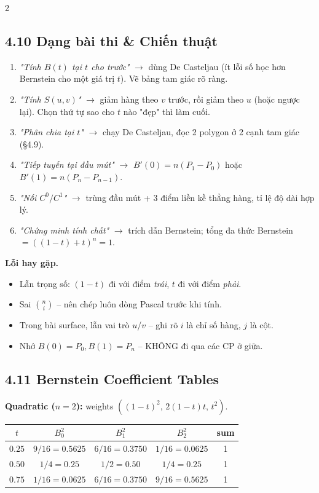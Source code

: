 \begin{paracol}{2}
\switchcolumn

\subsection*{4.10 Dạng bài thi \& Chiến thuật}

\begin{enumerate}[leftmargin=*,nosep]
  \item \emph{"Tính $B(t)$ tại $t$ cho trước"} $\to$ dùng De Casteljau (ít lỗi số học hơn Bernstein cho một giá trị $t$). Vẽ bảng tam giác rõ ràng.
  \item \emph{"Tính $S(u,v)$"} $\to$ giảm hàng theo $v$ trước, rồi giảm theo $u$ (hoặc ngược lại). Chọn thứ tự sao cho $t$ nào "đẹp" thì làm cuối.
  \item \emph{"Phân chia tại $t$"} $\to$ chạy De Casteljau, đọc 2 polygon ở 2 cạnh tam giác (\S 4.9).
  \item \emph{"Tiếp tuyến tại đầu mút"} $\to$ $B'(0)=n(P_1-P_0)$ hoặc $B'(1)=n(P_n-P_{n-1})$.
  \item \emph{"Nối $C^0/C^1$"} $\to$ trùng đầu mút + 3 điểm liền kề thẳng hàng, tỉ lệ độ dài hợp lý.
  \item \emph{"Chứng minh tính chất"} $\to$ trích dẫn Bernstein; tổng đa thức Bernstein $=((1-t)+t)^n=1$.
\end{enumerate}

\textbf{Lỗi hay gặp.}
\begin{itemize}[leftmargin=*,nosep]
  \item Lẫn trọng số: $(1-t)$ đi với điểm \emph{trái}, $t$ đi với điểm \emph{phải}.
  \item Sai $\binom{n}{i}$ -- nên chép luôn dòng Pascal trước khi tính.
  \item Trong bài surface, lẫn vai trò $u$/$v$ -- ghi rõ $i$ là chỉ số hàng, $j$ là cột.
  \item Nhớ $B(0)=P_0, B(1)=P_n$ -- KHÔNG đi qua các CP ở giữa.
\end{itemize}

\switchcolumn*

\subsection*{4.11 Bernstein Coefficient Tables}

\textbf{Quadratic ($n=2$):} weights $((1-t)^2,\,2(1-t)t,\,t^2)$.
\begin{center}\small
\begin{tabular}{c|ccc|c}
$t$ & $B_0^2$ & $B_1^2$ & $B_2^2$ & sum \\\midrule
$0.25$ & $9/16=0.5625$ & $6/16=0.3750$ & $1/16=0.0625$ & 1\\
$0.50$ & $1/4=0.25$    & $1/2=0.50$    & $1/4=0.25$    & 1\\
$0.75$ & $1/16=0.0625$ & $6/16=0.3750$ & $9/16=0.5625$ & 1\\
\end{tabular}
\end{center}


\end{paracol}
